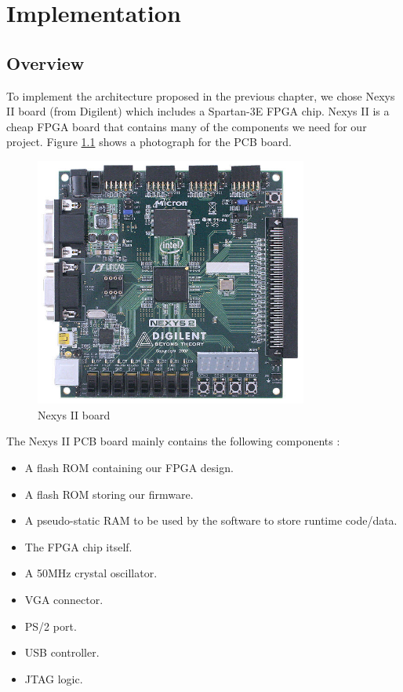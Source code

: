 \documentclass[oneside]{book}
\begin{document}

\chapter{Implementation}

\section{Overview}

To implement the architecture proposed in the previous chapter, we chose
Nexys II board (from Digilent) which includes a Spartan-3E FPGA chip.
Nexys II is a cheap FPGA board that contains many of the components
we need for our project. Figure \ref{nexys2} shows a photograph
for the PCB board.

\begin{figure}[H]
\begin{center}
\includegraphics[width=0.8\textwidth]{nexys2.jpg}
\end{center}
\caption{Nexys II board}
\label{nexys2}
\end{figure}

\newpage

The Nexys II PCB board mainly contains the following components
\cite{nexys2_rm}:

\begin{itemize}
\item A flash ROM containing our FPGA design.
\item A flash ROM storing our firmware.
\item A pseudo-static RAM to be used by the software to
      store runtime code/data.
\item The FPGA chip itself.
\item A 50MHz crystal oscillator.
\item VGA connector.
\item PS/2 port.
\item USB controller.
\item JTAG logic.
\end{itemize}
\end{document}
